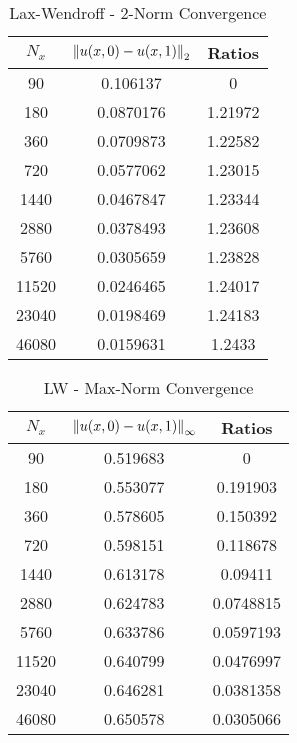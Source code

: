 \documentclass[12pt]{article}
\begin{document}
\begin{minipage}{0.5\textwidth}
\begin{table}[H]
\caption{Lax-Wendroff - 2-Norm Convergence}
\centering\begin{tabular}{||c|cc||}
\hline \hline
$N_x$  & $\norm{u(x,0)-u(x,1)}_2$ &  Ratios \\
\hline
    90 &      0.106137  &  0       \\
   180 &      0.0870176 &  1.21972 \\
   360 &      0.0709873 &  1.22582 \\
   720 &      0.0577062 &  1.23015 \\
  1440 &      0.0467847 &  1.23344 \\
  2880 &      0.0378493 &  1.23608 \\
  5760 &      0.0305659 &  1.23828 \\
 11520 &      0.0246465 &  1.24017 \\
 23040 &      0.0198469 &  1.24183 \\
 46080 &      0.0159631 &  1.2433  \\
\hline
\end{tabular}\end{table}\end{minipage}
\begin{minipage}{0.5\textwidth}
\begin{table}[H]
\caption{LW - Max-Norm Convergence}
\centering\begin{tabular}{||c|cc||}
\hline \hline
   $N_x$ & $\norm{u(x,0)-u(x,1)}_{\infty}$ &   Ratios \\
\hline
    90 &         0.519683 & 0         \\
   180 &         0.553077 & 0.191903  \\
   360 &         0.578605 & 0.150392  \\
   720 &         0.598151 & 0.118678  \\
  1440 &         0.613178 & 0.09411   \\
  2880 &         0.624783 & 0.0748815 \\
  5760 &         0.633786 & 0.0597193 \\
 11520 &         0.640799 & 0.0476997 \\
 23040 &         0.646281 & 0.0381358 \\
 46080 &         0.650578 & 0.0305066 \\
\hline \hline
\end{tabular}\end{table}\end{minipage}
\end{document}
